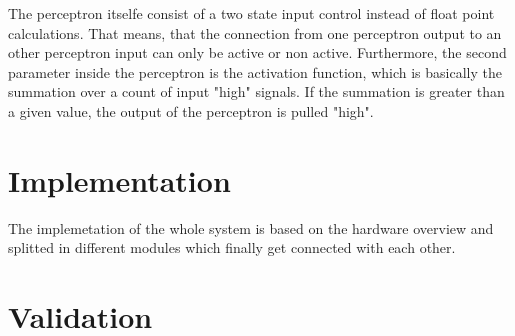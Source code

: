 \documentclass{article}
\numberwithin{equation}{section}
\begin{document}
The perceptron itselfe consist of a two state input control instead of float point calculations. That
means, that the connection from one perceptron output to an other perceptron input can only be active
or non active. Furthermore, the second parameter inside the perceptron is the activation function, which
is basically the summation over a count of input "high" signals. If the summation is greater than a given
value, the output of the perceptron is pulled "high".

\section{Implementation}
The implemetation of the whole system is based on the hardware overview and splitted in different modules
which finally get connected with each other.

\section{Validation}
\end{document}
